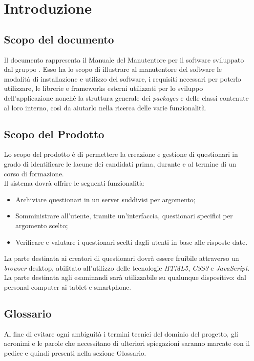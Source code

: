 \newpage
\section{Introduzione}
\subsection{Scopo del documento}
Il documento rappresenta il Manuale del Manutentore per il software \progetto{} sviluppato dal gruppo \gruppo. Esso ha lo scopo di illustrare al manutentore del software le modalità di installazione e utilizzo del software, i requisiti necessari per poterlo utilizzare, le librerie e frameworks esterni utilizzati per lo sviluppo dell'applicazione nonché la struttura generale dei \textit{packages} e delle classi contenute al loro interno, così da aiutarlo nella ricerca delle varie funzionalità. 
\subsection{Scopo del Prodotto}
Lo scopo del prodotto è di permettere la creazione e gestione di questionari in grado di identificare le lacune dei candidati prima, durante e al termine di un corso di formazione. 
\\Il sistema dovrà offrire le seguenti funzionalità:
\begin{itemize}
	\item
	Archiviare questionari in un server suddivisi per argomento;
	\item
	Somministrare all'utente, tramite un'interfaccia, questionari specifici per argomento scelto;
	\item
	Verificare e valutare i questionari scelti dagli utenti in base alle risposte date.
\end{itemize}
La parte destinata ai creatori di questionari dovrà essere fruibile attraverso un \textit{browser} desktop, abilitato all'utilizzo delle tecnologie \textit{HTML5}, \textit{CSS3} e \textit{JavaScript}. La parte destinata agli esaminandi sarà utilizzabile su qualunque dispositivo: dal personal computer ai tablet e smartphone.
\subsection{Glossario}
Al fine di evitare ogni ambiguità i termini tecnici del dominio del progetto, gli acronimi e le parole che necessitano di ulteriori spiegazioni saranno marcate con il pedice  e quindi presenti nella sezione Glossario.

